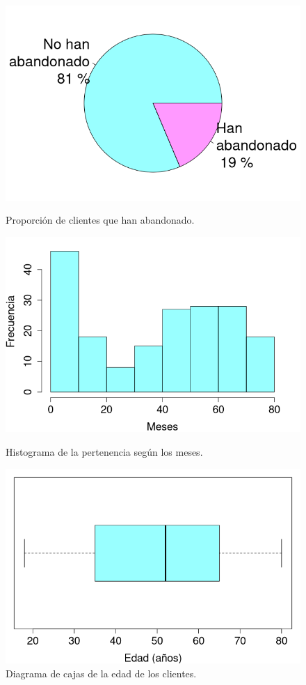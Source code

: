 \documentclass[10pt,a4paper, titlepage]{article}
\begin{document}
\begin{figure}[!htb]
  \includegraphics[width=\linewidth]{per-freq-pie}
  \caption{Proporción de clientes que han abandonado.}\label{fig:per-freq-pie}
\endminipage\hfill
{}
  \includegraphics[width=\linewidth]{per-freq-hist}
  \caption{Histograma de la pertenencia según los meses.}\label{fig:per-freq-hist}
\endminipage\hfill
{}
  \includegraphics[width=\linewidth]{age-box}
  \caption{Diagrama de cajas de la edad de los clientes.}\label{fig:age-box}
\endminipage\hfill
\end{figure}
\end{document}
